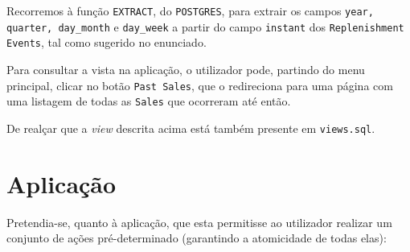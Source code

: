 \documentclass[12pt,a4paper]{article}
\begin{document}
  

  Recorremos à função \texttt{EXTRACT}, do \texttt{POSTGRES}, para extrair os campos \texttt{year, 
  quarter, day\_month} e \texttt{day\_week} a partir do campo \texttt{instant} dos
  \texttt{Replenishment Events}, tal como sugerido no enunciado.

  Para consultar a vista na aplicação, o utilizador pode, partindo do menu principal,
  clicar no botão \texttt{Past Sales}, que o redireciona para uma página com uma
  listagem de todas as \texttt{Sales} que ocorreram até então.

  De realçar que a \textit{view} descrita acima está também presente em \texttt{views.sql}.

  \section*{Aplicação}


  Pretendia-se, quanto à aplicação, que esta permitisse ao utilizador realizar um conjunto
  de ações pré-determinado (garantindo a atomicidade de todas elas):
\end{document}
